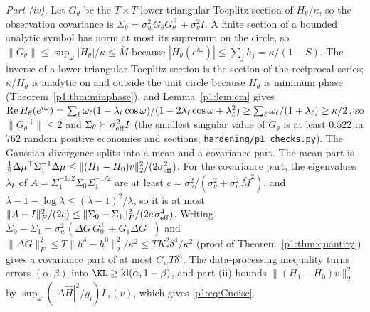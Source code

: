\emph{Part (iv).} Let $G_\theta$ be the $T\times T$ lower-triangular Toeplitz section of $H_\theta/\kappa$, so the observation covariance is $\Sigma_\theta=\sigma_w^2G_\theta G_\theta^\top+\sigma_\nu^2I$. A finite section of a bounded analytic symbol has norm at most its supremum on the circle, so $\|G_\theta\|\le\sup_\omega|H_\theta|/\kappa\le\bar M$ because $|H_\theta(e^{i\omega})|\le\sum_jh_j=\kappa/(1-S)$. The inverse of a lower-triangular Toeplitz section is the section of the reciprocal series; $\kappa/H_\theta$ is analytic on and outside the unit circle because $H_\theta$ is minimum phase (Theorem~\ref{p1:thm:minphase}), and Lemma~\ref{p1:lem:cm} gives ${\rm Re}\,H_\theta(e^{i\omega})=\sum_\ell\omega_\ell(1-\lambda_\ell\cos\omega)/(1-2\lambda_\ell\cos\omega+\lambda_\ell^2)\ge\sum_\ell\omega_\ell/(1+\lambda_\ell)\ge\kappa/2$, so $\|G_\theta^{-1}\|\le2$ and $\Sigma_\theta\succeq\sigma_{\rm eff}^2I$ (the smallest singular value of $G_\theta$ is at least $0.522$ in 762 random positive economies and sections; \texttt{hardening/p1\_checks.py}). The Gaussian divergence splits into a mean and a covariance part. The mean part is $\tfrac12\Delta\mu^\top\Sigma_1^{-1}\Delta\mu\le\|(H_1-H_0)v\|_2^2/(2\sigma_{\rm eff}^2)$. For the covariance part, the eigenvalues $\lambda_k$ of $A=\Sigma_1^{-1/2}\Sigma_0\Sigma_1^{-1/2}$ are at least $c=\sigma_\nu^2/(\sigma_\nu^2+\sigma_w^2\bar M^2)$, and $\lambda-1-\log\lambda\le(\lambda-1)^2/\lambda$, so it is at most $\|A-I\|_F^2/(2c)\le\|\Sigma_0-\Sigma_1\|_F^2/(2c\,\sigma_{\rm eff}^4)$. Writing $\Sigma_0-\Sigma_1=\sigma_w^2(\Delta G\,G_0^\top+G_1\Delta G^\top)$ and $\|\Delta G\|_F^2\le T\|h^\delta-h^0\|_2^2/\kappa^2\le TK_*^2\delta^4/\kappa^2$ (proof of Theorem~\ref{p1:thm:quantity}) gives a covariance part of at most $C_wT\delta^4$. The data-processing inequality turns errors $(\alpha,\beta)$ into $\KL\ge{\rm kl}(\alpha,1-\beta)$, and part (ii) bounds $\|(H_1-H_0)v\|_2^2$ by $\sup_\omega(|\Delta\hat H|^2/g_i)L_i(v)$, which gives \eqref{p1:eq:Cnoise}.

